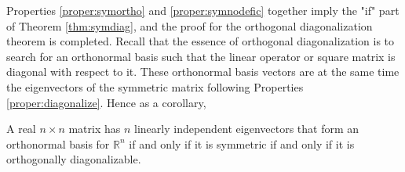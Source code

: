 \par
Properties \ref{proper:symortho} and \ref{proper:symnodefic} together imply the "if" part of Theorem \ref{thm:symdiag}, and the proof for the orthogonal diagonalization theorem is completed. Recall that the essence of orthogonal diagonalization is to search for an orthonormal basis such that the linear operator or square matrix is diagonal with respect to it. These orthonormal basis vectors are at the same time the eigenvectors of the symmetric matrix following Properties \ref{proper:diagonalize}. Hence as a corollary,
\begin{proper}
\label{proper:orthobasissym}
A real $n \times n$ matrix has $n$ linearly independent eigenvectors that form an orthonormal basis for $\mathbb{R}^n$ if and only if it is symmetric if and only if it is orthogonally diagonalizable.
\end{proper}

